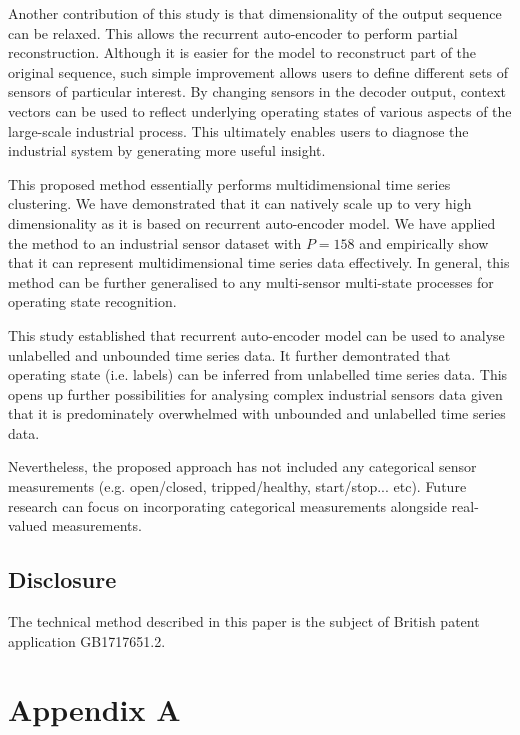 \documentclass[runningheads]{llncs}
\begin{document}
Another contribution of this study is that dimensionality of the output sequence can be relaxed. This allows the recurrent auto-encoder to perform partial reconstruction. Although it is easier for the model to reconstruct part of the original sequence, such simple improvement allows users to define different sets of sensors of particular interest. By changing sensors in the decoder output, context vectors can be used to reflect underlying operating states of various aspects of the large-scale industrial process. This ultimately enables users to diagnose the industrial system by generating more useful insight.

This proposed method essentially performs multidimensional time series clustering. We have demonstrated that it can natively scale up to very high dimensionality as it is based on recurrent auto-encoder model. We have applied the method to an industrial sensor dataset with \(P=158\) and empirically show that it can represent multidimensional time series data effectively. In general, this method can be further generalised to any multi-sensor multi-state processes for operating state recognition. 

This study established that recurrent auto-encoder model can be used to analyse unlabelled and unbounded time series data. It further demontrated that operating state (i.e. labels) can be inferred from unlabelled time series data. This opens up further possibilities for analysing complex industrial sensors data given that it is predominately overwhelmed with unbounded and unlabelled time series data.

Nevertheless, the proposed approach has not included any categorical sensor measurements (e.g. open/closed, tripped/healthy, start/stop... etc). Future research can focus on incorporating categorical measurements alongside real-valued measurements.

\subsection*{Disclosure}

The technical method described in this paper is the subject of British patent application GB1717651.2.




\newpage
\section*{Appendix A}
\end{document}

